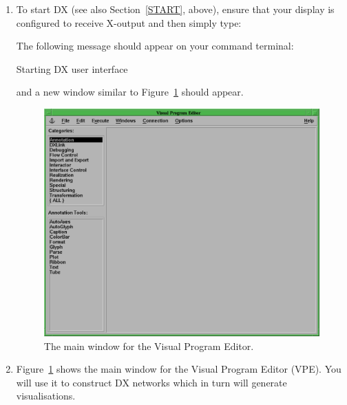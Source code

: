 \documentclass[twoside,11pt]{starlink}
\begin{document}
\begin{enumerate}

  \item To start DX (see also Section~\ref{START}, above), ensure that
   your display is configured to receive X-output and then simply type:

\begin{terminalv}
\end{terminalv}

   The following message should appear on your command terminal:

\begin{terminalv}
Starting DX user interface
\end{terminalv}

   and a new window similar to Figure~\ref{VPE} should appear.

  \begin{figure}[htbp]
  \label{VPE}

  \begin{center}
  \leavevmode
  \includegraphics[width=450pt]{sc2_vpe}
  \end{center}

  \caption[The main window for the Visual Program Editor.]{The main
   window for the Visual Program Editor.}

  \end{figure}

  \item Figure~\ref{VPE} shows the main window for the Visual Program
   Editor (VPE). You will use it to construct DX networks which in turn
   will generate visualisations.


\end{enumerate}
\end{document}
